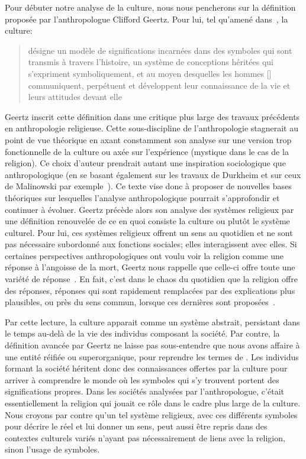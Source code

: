 Pour débuter notre analyse de la culture, nous nous pencherons sur la définition proposée par l'anthropologue Clifford Geertz.
Pour lui, tel qu'amené dans~, la culture: \blockquote[{\cite[21]{Geertz1972}}][.]{\textelp{} désigne un modèle de significations incarnées dans des symboles qui sont transmis à travers l'histoire, un système de conceptions héritées qui s'expriment symboliquement, et au moyen desquelles les hommes [] communiquent, perpétuent et développent leur connaissance de la vie et leurs attitudes devant elle}.
Geertz inscrit cette définition dans une critique plus large des travaux précédents en anthropologie religieuse.
Cette sous-discipline de l'anthropologie stagnerait au point de vue théorique en axant constamment son analyse sur une version trop fonctionnelle de la culture ou axée sur l'expérience (mystique dans le cas de la religion).
Ce choix d'auteur prendrait autant une inspiration sociologique que anthropologique (en se basant également sur les travaux de Durkheim et sur ceux de Malinowski par exemple~\citep[20]{Geertz1972}).
Ce texte vise donc à proposer de nouvelles bases théoriques sur lesquelles l'analyse anthropologique pourrait s'approfondir et continuer à évoluer.
Geertz précède alors son analyse des systèmes religieux par une définition renouvelée de ce en quoi consiste la culture ou plutôt le système culturel.
Pour lui, ces systèmes religieux offrent un sens au quotidien et ne sont pas nécessaire subordonné aux fonctions sociales; elles interagissent avec elles.
Si certaines perspectives anthropologiques ont voulu voir la religion comme une réponse à l'angoisse de la mort, Geertz nous rappelle que celle-ci offre toute une variété de réponse~\citep[][37]{Geertz1972}.
En fait, c'est dans le chaos du quotidien que la religion offre des réponses, réponses qui sont rapidement remplacées par des explications plus plausibles, ou près du sens commun, lorsque ces dernières sont proposées~\citep[][39]{Geertz1972}.

Par cette lecture, la culture apparait comme un système abstrait, persistant dans le temps au-delà de la vie des individus composant la société.
Par contre, la définition avancée par Geertz ne laisse pas sous-entendre que nous avons affaire à une entité réifiée ou superorganique, pour reprendre les termes de \citet{Duncan1980}.
Les individus formant la société héritent donc des connaissances offertes par la culture pour arriver à comprendre le monde où les symboles qui s'y trouvent portent des significations propres.
Dans les sociétés analysées par l'anthropologue, c'était essentiellement la religion qui jouait ce rôle dans le cadre plus large de la culture.
Nous croyons par contre qu'un tel système religieux, avec ces différents symboles pour décrire le réel et lui donner un sens, peut aussi être repris dans des contextes culturels variés n'ayant pas nécessairement de liens avec la religion, sinon l'usage de symboles.

